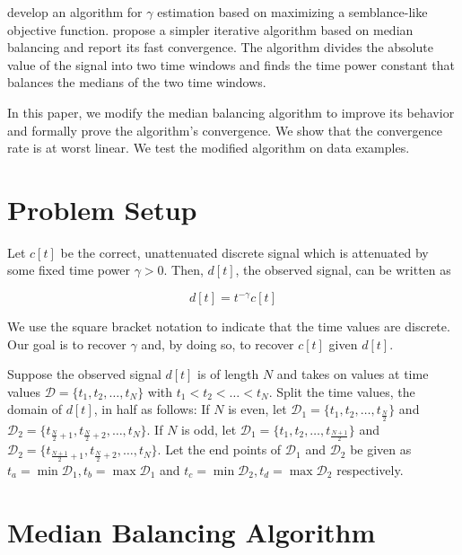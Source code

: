 \documentclass{segabs}
\newcommand{\Done}{{\mathcal{D}_1}}
\newcommand{\Dtwo}{{\mathcal{D}_2}}
\begin{document}
\cite{Fowler.sep.38.73} develop an algorithm for $\gamma$ estimation based on maximizing a semblance-like objective function. \cite{Claerbout.sep.42.81} propose a simpler iterative algorithm based on median balancing and report its fast convergence. The algorithm divides the absolute value of the signal into two time windows and finds the time power constant that balances the medians of the two time windows. 

In this paper, we modify the median balancing algorithm to improve its behavior and formally prove the algorithm's convergence. We show that the convergence rate is at worst linear. We test the modified algorithm on data examples.

\section*{Problem Setup}

Let $c[t]$ be the correct, unattenuated discrete signal which is attenuated by some fixed time power $\gamma > 0$. Then, $d[t]$, the observed signal, can be written as 

\begin{equation}
\label{eqn:d}
d[t] = t^{-\gamma} c[t] 
\end{equation}   

We use the square bracket notation to indicate that the time values are discrete. Our goal is to recover $\gamma$ and, by doing so, to recover $c[t]$ given $d[t]$.  

Suppose the observed signal $d[t]$ is of length $N$ and takes on values at time values $\mathcal{D} = \{t_1,t_2,\ldots,t_N\}$ with  $t_1 < t_2 < \ldots < t_N$. Split the time values, the domain of $d[t]$, in half as follows: If $N$ is even, let $\mathcal{D}_1 = \{t_1, t_2,\ldots, t_\frac{N}{2} \}$ and $\mathcal{D}_2 = \{ t_{\frac{N}{2}+1},t_{\frac{N}{2}+2}, \ldots, t_N \}$. If $N$ is odd, let $\mathcal{D}_1 = \{t_1, t_2,\ldots, t_\frac{N+1}{2} \}$ and $\mathcal{D}_2 = \{ t_{\frac{N+1}{2}+1},t_{\frac{N}{2}+2}, \ldots, t_N \}$. Let the end points of $\mathcal{D}_1$ and $\mathcal{D}_2$ be given as $t_a=\min{\Done}, t_b=\max{\Done}$ and $t_c=\min{\Dtwo}, t_d=\max{\Dtwo}$ respectively.



\section*{Median Balancing Algorithm}
\end{document}
